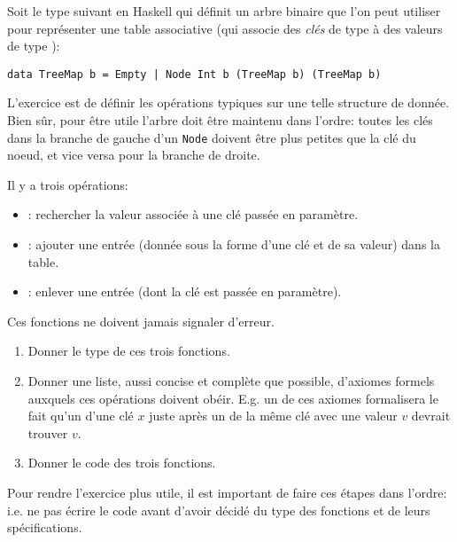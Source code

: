 \begin{Exercise}[title={Table associative}]
  \label{ex:treemap}
Soit le type suivant en Haskell qui définit un arbre binaire que l'on peut
utiliser pour représenter une table associative (qui associe des \emph{clés}
de type  à des valeurs de type ):
\begin{verbatim}
data TreeMap b = Empty | Node Int b (TreeMap b) (TreeMap b)
\end{verbatim}
L'exercice est de définir les opérations typiques sur une telle
structure de donnée.  Bien sûr, pour être utile l'arbre doit être
maintenu dans l'ordre: toutes les clés dans la branche de gauche d'un
\texttt{Node} doivent être plus petites que la clé du noeud, et
vice versa pour la branche de droite.

Il y a trois opérations:
\begin{itemize}
\item {}: rechercher la valeur associée à une clé passée
  en paramètre.
\item {}: ajouter une entrée (donnée sous la forme
  d'une clé et de sa valeur) dans la table.
\item {}: enlever une entrée (dont la clé est passée
  en paramètre).
\end{itemize}
Ces fonctions ne doivent jamais signaler d'erreur.
\begin{enumerate}
\item Donner le type de ces trois fonctions.
\item Donner une liste, aussi concise et complète que possible,
  d'axiomes formels auxquels ces opérations doivent obéir.  E.g. un de
  ces axiomes formalisera le fait qu'un  d'une clé
  $x$ juste après un  de la même clé avec une
  valeur $v$ devrait trouver $v$.
\item Donner le code des trois fonctions.
\end{enumerate}
Pour rendre l'exercice plus utile, il est important de faire ces étapes dans
l'ordre: i.e. ne pas écrire le code avant d'avoir décidé du type
des fonctions et de leurs spécifications.
\end{Exercise}

\begin{Answer}[ref={ex:treemap}]
\end{Answer}